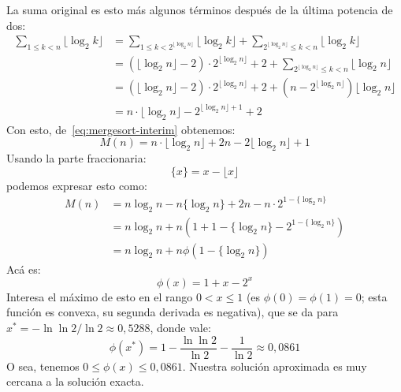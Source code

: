  La suma original es esto más algunos términos
  después de la última potencia de dos:
  \begin{align*}
    \sum_{1 \le k < n} \lfloor \log_2 k \rfloor
      &= \sum_{1 \le k < 2^{\lfloor \log_2 n \rfloor}} \lfloor \log_2 k \rfloor
           + \sum_{2^{\lfloor \log_2 n \rfloor} \le k < n}
               \lfloor \log_2 k \rfloor \\
      &= (\lfloor \log_2 n \rfloor - 2) \cdot 2^{\lfloor \log_2 n \rfloor} + 2
           + \sum_{2^{\lfloor \log_2 n \rfloor} \le k < n}
               \lfloor \log_2 n \rfloor \\
      &= (\lfloor \log_2 n \rfloor - 2) \cdot 2^{\lfloor \log_2 n \rfloor} + 2
           + (n - 2^{\lfloor \log_2 n \rfloor})
               \lfloor \log_2 n \rfloor \\
      &= n \cdot \lfloor \log_2 n \rfloor
           - 2^{\lfloor \log_2 n \rfloor + 1}
           + 2
  \end{align*}
  Con esto,
  de~\ref{eq:mergesort-interim}
  obtenemos:
  \begin{equation*}
    \label{eq:mergesort-solution}
    M(n)
      = n \cdot \lfloor \log_2 n \rfloor
          + 2 n
          - 2 {\lfloor \log_2 n \rfloor + 1}
  \end{equation*}
  Usando la parte fraccionaria:
  \begin{equation*}
    \{ x \}
      = x - \lfloor x \rfloor
  \end{equation*}
  podemos expresar esto como:
  \begin{align*}
    M(n)
      &= n \log_2 n - n \{ \log_2 n \}
          + 2 n
          - n \cdot 2^{1 - \{ \log_2 n \}} \\
      &= n \log_2 n
          + n \left(
                1 + 1 - \{ \log_2 n \} - 2^{1 - \{ \log_2 n \}}
              \right) \\
      &= n \log_2 n + n \phi(1 - \{ \log_2 n \})
  \end{align*}
  Acá es:
  \begin{equation}
    \label{eq:phi}
    \phi(x)
      = 1 + x - 2^x
  \end{equation}
  Interesa el máximo de esto en el rango \(0 < x \le 1\)
  (es \(\phi(0) = \phi(1) = 0\);
   esta función es convexa,
   su segunda derivada es negativa),
  que se da para \(x^* = - \ln \ln 2 / \ln 2 \approx 0,5288\),
  donde vale:
  \begin{equation*}
    \phi(x^*)
      = 1 - \frac{\ln \ln 2}{\ln 2} - \frac{1}{\ln 2}
      \approx 0,0861
  \end{equation*}
  O sea,
  tenemos \(0 \le \phi(x) \le 0,0861\).
  Nuestra solución aproximada es muy cercana a la solución exacta.

